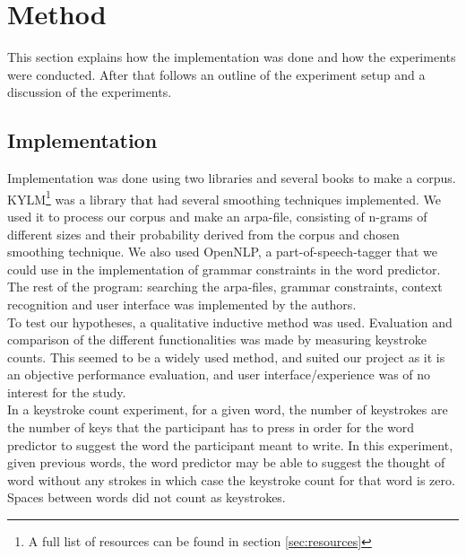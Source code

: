 \section{Method}
This section explains how the implementation was done and how the experiments were conducted. After that follows an outline of the experiment setup and a discussion of the experiments.
\subsection{Implementation}
Implementation was done using two libraries and several books to make a corpus. KYLM\footnote{A full list of resources can be found in section \ref{sec:resources}} was a library that had several smoothing techniques implemented. We used it to process our corpus and make an arpa-file, consisting of n-grams of different sizes and their probability derived from the corpus and chosen smoothing technique. We also used OpenNLP, a part-of-speech-tagger that we could use in the implementation of grammar constraints in the word predictor. The rest of the program: searching the arpa-files, grammar constraints, context recognition and user interface was implemented by the authors.\\

To test our hypotheses, a qualitative inductive method was used. Evaluation and comparison of the different functionalities was made by measuring keystroke counts. This seemed to be a widely used method, and suited our project as it is an objective performance evaluation, and user interface/experience was of no interest for the study.\\

In a keystroke count experiment, for a given word, the number of keystrokes are the number of keys that the participant has to press in order for the word predictor to suggest the word the participant meant to write. In this experiment, given previous words, the word predictor may be able to suggest the thought of word without any strokes in which case the keystroke count for that word is zero. Spaces between words did not count as keystrokes.

